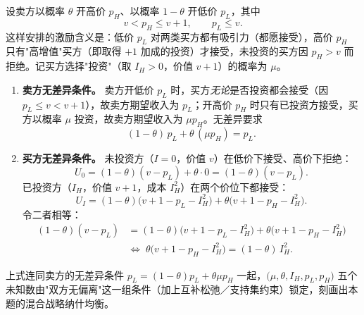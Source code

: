设卖方以概率 $\theta$ 开高价 $p_H$、以概率 $1-\theta$ 开低价 $p_L$，其中
\[
v<p_H\le v+1,\qquad p_L\le v.
\]\indent
这样安排的激励含义是：低价 $p_L$ 对两类买方都有吸引力（都愿接受），高价 $p_H$ 只有"高增值"买方（即取得 $+1$ 加成的投资）才接受，未投资的买方因 $p_H>v$ 而拒绝。记买方选择"投资"（取 $I_H>0$，价值 $v+1$）的概率为 $\mu$。

\begin{enumerate}[leftmargin=2em]
  \item \textbf{卖方无差异条件。} 卖方开低价 $p_L$ 时，买方\emph{无论}是否投资都会接受（因 $p_L\le v<v+1$），故卖方期望收入为 $p_L$；开高价 $p_H$ 时只有已投资方接受，买方以概率 $\mu$ 投资，故卖方期望收入为 $\mu p_H$。无差异要求
    \[
    (1-\theta)\,p_L+\theta\,(\mu p_H)=p_L.
    \]\indent
  \item \textbf{买方无差异条件。} 未投资方（$I=0$，价值 $v$）在低价下接受、高价下拒绝：
    \[
    U_{0}=(1-\theta)(v-p_L)+\theta\cdot 0=(1-\theta)(v-p_L).
    \]\indent
    已投资方（$I_H$，价值 $v+1$，成本 $I_H^2$）在两个价位下都接受：
    \[
    U_{I}=(1-\theta)\bigl(v+1-p_L-I_H^2\bigr)+\theta\bigl(v+1-p_H-I_H^2\bigr).
    \]\indent
    令二者相等：
    \begin{align*}
    (1-\theta)(v-p_L)
    &=(1-\theta)\bigl(v+1-p_L-I_H^2\bigr)+\theta\bigl(v+1-p_H-I_H^2\bigr)\\[4pt]
    &\Longleftrightarrow\;
    \theta\bigl(v+1-p_H-I_H^2\bigr)
    =(1-\theta)\,I_H^2 .
    \end{align*}\indent
\end{enumerate}

上式连同卖方的无差异条件 $p_L=(1-\theta)p_L+\theta\mu p_H$ 一起，$\bigl(\mu,\theta,I_H,p_L,p_H\bigr)$ 五个未知数由"双方无偏离"这一组条件（加上互补松弛／支持集约束）锁定，刻画出本题的混合战略纳什均衡。





